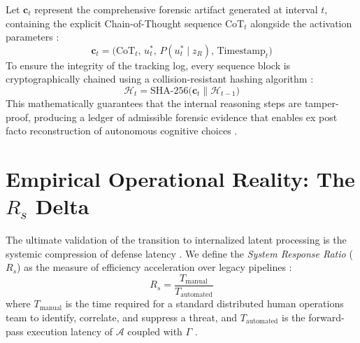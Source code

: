 Let $\mathbf{c}_t$ represent the comprehensive forensic artifact generated at interval $t$, containing the explicit Chain-of-Thought sequence $\text{CoT}_t$ alongside the activation parameters \cite{Manifesto:IncidentResponse}:
\begin{equation}
    \mathbf{c}_t = \Big( \text{CoT}_t, \, u^*_t, \, P(u^*_t \mid z_R), \, \text{Timestamp}_t \Big)
\end{equation}
To ensure the integrity of the tracking log, every sequence block is cryptographically chained using a collision-resistant hashing algorithm \cite{Manifesto:IncidentResponse}:
\begin{equation}
    \mathcal{H}_t = \text{SHA-256}\Big(\mathbf{c}_t \parallel \mathcal{H}_{t-1}\Big)
\end{equation}
This mathematically guarantees that the internal reasoning steps are tamper-proof, producing a ledger of admissible forensic evidence that enables ex post facto reconstruction of autonomous cognitive choices \cite{Manifesto:IncidentResponse}.

\section{\texorpdfstring{Empirical Operational Reality: The $R_s$ Delta}{Empirical Operational Reality: The Rs Delta}}
The ultimate validation of the transition to internalized latent processing is the systemic compression of defense latency \cite{DLI:MemoryIntegration}. We define the \textit{System Response Ratio} ($R_s$) as the measure of efficiency acceleration over legacy pipelines \cite{Manifesto:IncidentResponse}:
\begin{equation}
    R_s = \frac{T_{\text{manual}}}{T_{\text{automated}}}
\end{equation}
where $T_{\text{manual}}$ is the time required for a standard distributed human operations team to identify, correlate, and suppress a threat, and $T_{\text{automated}}$ is the forward-pass execution latency of $\mathcal{A}$ coupled with $\Gamma$ \cite{Manifesto:IncidentResponse}.

